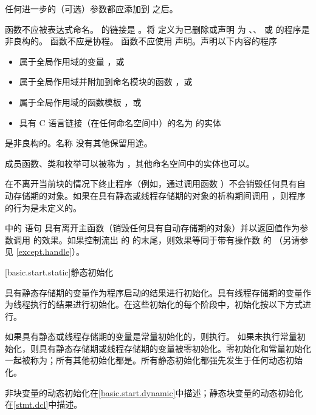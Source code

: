 \recommended
任何进一步的（可选）参数都应添加到  之后。

\pnum
{} 函数不应被表达式命名。
%
 的链接是 。将  定义为已删除或声明  为 、、 或  的程序是非良构的。 函数不应是协程。 函数不应使用  声明。声明以下内容的程序
\begin{itemize}
\item
属于全局作用域的变量 ，或
\item
属于全局作用域并附加到命名模块的函数 ，或
\item
属于全局作用域的函数模板 ，或
\item
具有 C 语言链接（在任何命名空间中）的名为  的实体
\end{itemize}
是非良构的。名称  没有其他保留用途。
\begin{example}
成员函数、类和枚举可以被称为 ，其他命名空间中的实体也可以。
\end{example}

\pnum
{}%
%
%
在不离开当前块的情况下终止程序（例如，通过调用函数 ）不会销毁任何具有自动存储期的对象。如果在具有静态或线程存储期的对象的析构期间调用 ，则程序的行为是未定义的。

\pnum
{}%
%
 中的  语句 具有离开主函数（销毁任何具有自动存储期的对象）并以返回值作为参数调用  的效果。如果控制流出  的  的末尾，则效果等同于带有操作数  的 （另请参见 \ref{except.handle}）。

[basic.start.static]{静态初始化}

\pnum
{}%
%
具有静态存储期的变量作为程序启动的结果进行初始化。具有线程存储期的变量作为线程执行的结果进行初始化。在这些初始化的每个阶段中，初始化按以下方式进行。

\pnum
{}%
如果具有静态或线程存储期的变量是常量初始化的，则执行。
%
如果未执行常量初始化，则具有静态存储期或线程存储期的变量被零初始化。零初始化和常量初始化一起被称为；所有其他初始化都是。所有静态初始化都强先发生于任何动态初始化。
\begin{note}
非块变量的动态初始化在\ref{basic.start.dynamic}中描述；静态块变量的动态初始化在\ref{stmt.dcl}中描述。
\end{note}

